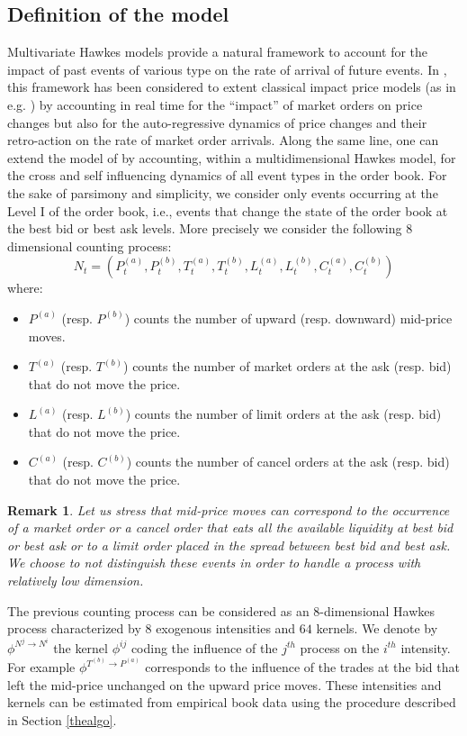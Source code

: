 \documentclass[a4paper,11pt]{article}
\newtheorem{remark}{Remark}[section]
\newcommand{\PA}{P^{(a)}}
\newcommand{\PB}{P^{(b)}}
\newcommand{\TA}{T^{(a)}}
\newcommand{\TB}{T^{(b)}}
\newcommand{\CA}{C^{(a)}}
\newcommand{\CB}{C^{(b)}}
\newcommand{\LA}{L^{(a)}}
\newcommand{\LB}{L^{(b)}}
\begin{document}
\subsection{Definition of the model}
\label{obmodel}
Multivariate Hawkes models provide a natural framework
to account for the impact of past events of various type on the rate of arrival of future events.
In \cite{bacry2014hawkes}, this framework has been considered to extent classical impact price
models (as in e.g. \cite{bouchaud2004fluctuations}) by accounting in real time for
the ``impact'' of market orders on price changes but also for the auto-regressive dynamics
of price changes and their retro-action on the rate of market order arrivals.
Along the same line, one can extend the model of \cite{bacry2014hawkes} by accounting, within
a multidimensional Hawkes model, for the cross and self influencing dynamics
of all event types in the order book. For the sake of parsimony and simplicity, we consider
only events occurring at the Level I of the order book, i.e., events that change the state
of the order book at the best bid or best ask levels.
More precisely we consider the following 8 dimensional counting process:
$$N_t = (\PA_t,\PB_t,\TA_t,\TB_t,\LA_t,\LB_t,\CA_t,\CB_t)$$
where:
\begin{itemize}
\item $\PA$ (resp. $\PB$) counts the number of upward (resp. downward) mid-price moves.
\item $\TA$ (resp. $\TB$) counts the number of market orders at the ask (resp. bid) that do not move the price.
\item $\LA$ (resp. $\LB$) counts the number of limit orders at the ask (resp. bid) that do not move the price.
\item $\CA$ (resp. $\CB$) counts the number of cancel orders at the ask (resp. bid) that do not move the price.
\end{itemize}

\begin{remark}
Let us stress that mid-price moves can correspond to the occurrence of a market order or a cancel order that eats all the available liquidity at best bid or best ask or to a limit order placed in the spread between best bid and best ask. We choose to not distinguish these events in order to handle a process with relatively low dimension.
\end{remark}

\noindent The previous counting process can be considered as an 8-dimensional Hawkes process characterized by $8$ exogenous intensities and $64$ kernels. We denote by $\phi^{N^j\rightarrow N^i}$ the kernel $\phi^{ij}$ coding the influence of the $j^{th}$ process on the $i^{th}$ intensity. For example $\phi^{\TB\rightarrow \PA}$ corresponds to the influence of the trades at the bid that left the mid-price unchanged on the upward price moves. These intensities and kernels can be estimated from empirical book data using the procedure described in Section \ref{thealgo}. \\
\end{document}
